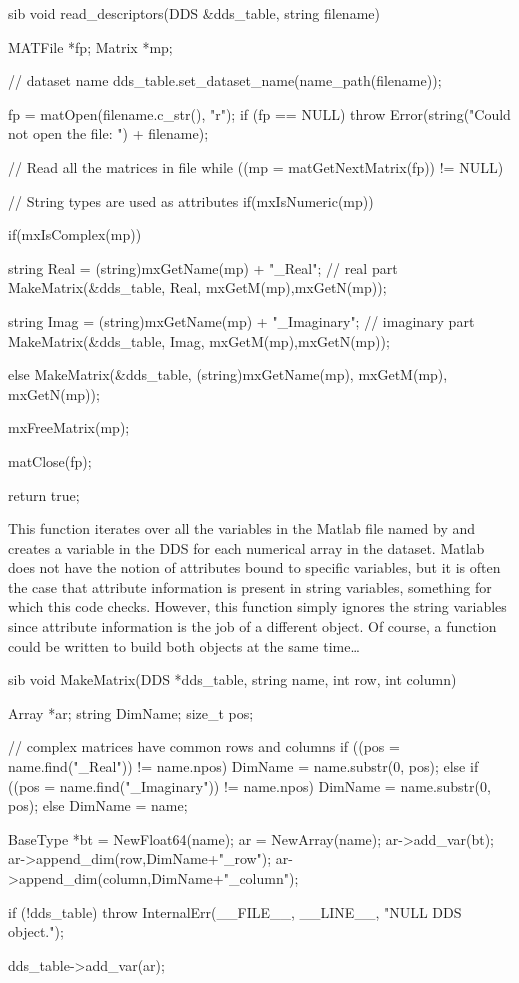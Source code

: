 \documentclass{dods-paper}
\begin{document}
\begin{vcode}{sib}
void
read_descriptors(DDS &dds_table, string filename)
{
    MATFile *fp;
    Matrix *mp;
      
    // dataset name
    dds_table.set_dataset_name(name_path(filename));
 
    fp = matOpen(filename.c_str(), "r");
    if (fp == NULL)
        throw Error(string("Could not open the file: ") + filename);

    // Read all the matrices in file
    while ((mp = matGetNextMatrix(fp)) != NULL) {

      // String types are used as attributes
        if(mxIsNumeric(mp)) {
            if(mxIsComplex(mp)) {
                string Real = (string)mxGetName(mp) + "_Real";
                // real part
                MakeMatrix(&dds_table, Real, mxGetM(mp),mxGetN(mp)); 

                string Imag = (string)mxGetName(mp) + "_Imaginary";
                // imaginary part
                MakeMatrix(&dds_table, Imag, mxGetM(mp),mxGetN(mp)); 
         } else
                MakeMatrix(&dds_table, (string)mxGetName(mp), mxGetM(mp),
                            mxGetN(mp)); 
         }

          mxFreeMatrix(mp);
    }
    matClose(fp);

    return true;
}
\end{vcode}

This function iterates over all the variables in the Matlab file named
by  and creates a variable in the DDS for each numerical
array in the dataset. Matlab does not have the notion of attributes
bound to specific variables, but it is often the case that attribute
information is present in string variables, something for which this code checks. However, this function simply ignores the string variables since
attribute information is the job of a different object. Of course, a
function could be written to build both objects at the same time\ldots

\begin{vcode}{sib} 
void 
MakeMatrix(DDS *dds_table, string name, int row, int column)
{
    Array *ar; 
    string DimName;
    size_t pos;
        
    // complex matrices have common rows and columns
    if ((pos = name.find("_Real")) != name.npos)
        DimName = name.substr(0, pos);
    else{
        if ((pos = name.find("_Imaginary")) != name.npos)
            DimName = name.substr(0, pos);
        else
            DimName = name;
    }

    BaseType *bt =  NewFloat64(name);    
    ar = NewArray(name);
    ar->add_var(bt);
    ar->append_dim(row,DimName+"_row");
    ar->append_dim(column,DimName+"_column");
        
    if (!dds_table)
        throw InternalErr(__FILE__, __LINE__, "NULL DDS object.");
   
    dds_table->add_var(ar);
}
\end{vcode}
\end{document}
